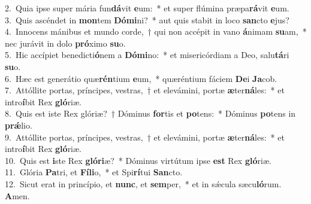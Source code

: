 {2.~}Quia ipse super mária fun\textbf{dá}vit \textbf{e}um:~* et super flúmina præpa\textbf{rá}vit \textbf{e}um.\\
{3.~}Quis ascéndet in \textbf{mon}tem \textbf{Dó}\textbf{mi}ni?~* aut quis stabit in loco \textbf{san}cto \textbf{e}jus?\\
{4.~}Innocens mánibus et mundo corde,~† qui non accépit in vano \textbf{á}nimam \textbf{su}am,~* nec jurávit in dolo \textbf{pró}ximo \textbf{su}o.\\
{5.~}Hic accípiet benedicti\textbf{ó}nem a \textbf{Dó}\textbf{mi}no:~* et misericórdiam a Deo, salu\textbf{tá}ri \textbf{su}o.\\
{6.~}Hæc est generátio quæ\textbf{rén}tium \textbf{e}um,~* quæréntium fáciem \textbf{De}i \textbf{Ja}cob.\\
{7.~}Attóllite portas, príncipes, vestras,~† et elevámini, portæ \textbf{æ}ter\textbf{ná}les:~* et intro\textbf{í}bit Rex \textbf{gló}riæ.\\
{8.~}Quis est iste Rex glóriæ?~† Dóminus \textbf{for}tis et \textbf{po}tens:~* Dóminus \textbf{po}tens in \textbf{prǽ}lio.\\
{9.~}Attóllite portas, príncipes, vestras,~† et elevámini, portæ \textbf{æ}ter\textbf{ná}les:~* et intro\textbf{í}bit Rex \textbf{gló}riæ.\\
{10.~}Quis est \textbf{i}ste Rex \textbf{gló}\textbf{ri}æ?~* Dóminus virtútum ipse \textbf{est} Rex \textbf{gló}riæ.\\
{11.~}Glória \textbf{Pa}tri, et \textbf{Fí}\textbf{li}o,~* et Spi\textbf{rí}tui \textbf{San}cto.\\
{12.~}Sicut erat in princípio, et \textbf{nunc}, et \textbf{sem}per,~* et in sǽcula sæcu\textbf{ló}rum. \textbf{A}men.\\
